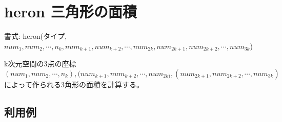 
%

\section{heron 三角形の面積\label{sect:heron}}

書式: heron(タイプ,$num_1,num_2,\cdots,n_k,num_{k+1},num_{k+2},\cdots,num_{2k},num_{2k+1},num_{2k+2},\cdots,num_{3k}$)

k次元空間の3点の座標$(num_1,num_2,\cdots,n_k),(num_{k+1},num_{k+2},\cdots,num_{2k)}
,(num_{2k+1},num_{2k+2},\cdots,num_{3k})$によって作られる3角形の面積を計算する。

\subsection*{利用例}


%
